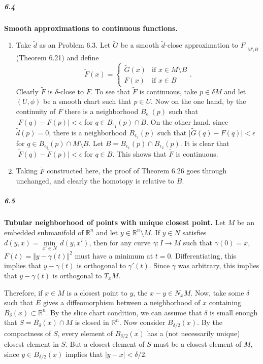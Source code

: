 \documentclass[10pt,letter]{article}
\begin{document}
\subparagraph{6.4} {\bf Smooth approximations to continuous functions.} 
\begin{enumerate}[label=(\alph*)]
\item Take $\tilde{d}$ as an Problem 6.3. Let $\tilde{G}$ be a smooth $\tilde{d}$-close approximation to $F \vert_{M \setminus B}$ (Theorem 6.21) and define
\[
\tilde{F}(x) = \begin{cases}
    \tilde{G}(x)  & \text{if } x \in M \setminus B  \\        
    F(x) & \text{if } x \in B 
\end{cases}.
\]
Clearly $\tilde{F}$ is $\delta$-close to $F$. To see that $\tilde{F}$ is continuous, take $p \in \delta M$ and let $(U,\phi)$ be a smooth chart such that $p \in U$. Now on the one hand, by the continuity of $F$ there is a neighborhood $B_{\epsilon_1}(p)$ such that $\vert F(q) - F(p) \vert < \epsilon$ for $q \in B_{\epsilon_1}(p) \cap B$. On the other hand, since  $\tilde{d}(p)  = 0$, there is a neighborhood $B_{\epsilon_2}(p)$ such that $\vert \tilde{G}(q) - F(q) \vert < \epsilon$ for $q \in B_{\epsilon_2}(p) \cap M \setminus B$. Let $B = B_{\epsilon_1}(p) \cap B_{\epsilon_2}(p)$. It is clear that $\vert \tilde{F}(q) - \tilde{F}(p) \vert < \epsilon$ for $q \in B$. This shows that $\tilde{F}$ is continuous. 
\item Taking $\tilde{F}$ constructed here, the proof of Theorem 6.26 goes through unchanged, and clearly the homotopy is relative to $B$.
\end{enumerate}

\subparagraph{6.5} {\bf Tubular neighborhood of points with unique closest point.}  Let $M$ be an embedded submanifold of $\mathbb{R}^n$ and let $y \in \mathbb{R}^n \setminus M$. If $y \in N$ satisfies $d(y,x) = \min \limits_{x' \in N} \, d(y,x')$, then for any curve $\gamma: I \rightarrow M$ such that $\gamma(0) = x$, $F(t) = \Vert y - \gamma(t) \Vert^2$ must have a minimum at $t = 0$.  Differentiating, this implies that $y - \gamma(t)$ is orthogonal to $\gamma'(t)$. Since $\gamma$ was arbitrary, this implies that $y - \gamma(t)$ is orthogonal to $T_xM$. 

Therefore, if $x \in M$ is a closest point to $y$, the $x-y \in N_xM$. Now, take some $\delta$ such that $E$ gives a diffeomorphism between a neighborhood of $x$ containing $\overline{B_{\delta}}(x) \subset \mathbb{R}^n$. By the slice chart condition, we can assume that $\delta$ is small enough that $S = \overline{B_{\delta}}(x) \cap M$ is closed in $\mathbb{R}^n$.  Now consider $ B_{\delta/2}(x)$. By the compactness of $S$, every element of $B_{\delta/2}(x)$ has a (not necessarily unique) closest element in $S$. But a closest element of $S$ must be a closest element of $M$, since $y \in B_{\delta/2}(x)$ implies that $\vert y -x \vert < \delta/2$. 
\end{document}
